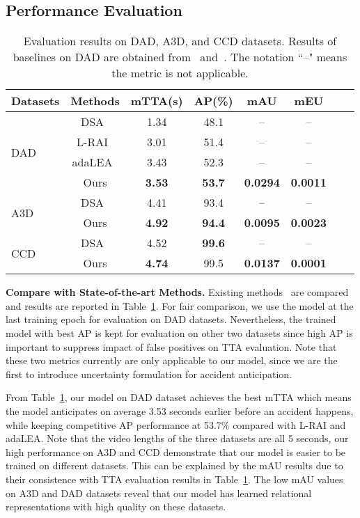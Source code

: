\documentclass[sigconf]{acmart}
\begin{document}
\subsection{Performance Evaluation}

\begin{table}
\setlength{\tabcolsep}{1.5mm}
\centering
\caption{Evaluation results on DAD, A3D, and CCD datasets. Results of baselines on DAD are obtained from~\cite{ZengCVPR2017} and~\cite{SuzukiCVPR2018}. The notation ``--" means the metric is not applicable.}
\label{table:main}
\normalsize
\begin{tabular}{l|c|cccccc}
    \hline
    Datasets &Methods &mTTA(s) &AP(\%) &mAU &mEU \\
    \hline
    \multirow{4}{*}{DAD~\cite{ChanACCV2016}}
    &DSA~\cite{ChanACCV2016} & 1.34 & 48.1 & -- & -- \\  &L-RAI~\cite{ZengCVPR2017} & 3.01 & 51.4 & -- & -- \\
    &adaLEA~\cite{SuzukiCVPR2018} & 3.43 & 52.3 & -- & -- \\
    &Ours & \textbf{3.53} & \textbf{53.7} & \textbf{0.0294} & \textbf{0.0011} \\
    \hline
    \multirow{2}{*}{A3D~\cite{YaoIROS2019}}
    &DSA~\cite{ChanACCV2016} & 4.41 & 93.4 & -- & --\\
    &Ours & \textbf{4.92} & \textbf{94.4} & \textbf{0.0095} & \textbf{0.0023} \\
    \hline
    \multirow{2}{*}{CCD} &DSA~\cite{ChanACCV2016} & 4.52 & \textbf{99.6} & -- & -- \\
    &Ours & \textbf{4.74} & 99.5 & \textbf{0.0137} & \textbf{0.0001} \\
    \hline
\end{tabular}
\end{table}

\textbf{Compare with State-of-the-art Methods.} Existing methods~\cite{ChanACCV2016,ZengCVPR2017,SuzukiCVPR2018} are compared and results are reported in Table~\ref{table:main}. For fair comparison, we use the model at the last training epoch for evaluation on DAD datasets. Nevertheless, the trained model with best AP is kept for evaluation on other two datasets since high AP is important to suppress impact of false positives on TTA evaluation. Note that these two metrics currently are only applicable to our model, since we are the first to introduce uncertainty formulation for accident anticipation.

From Table~\ref{table:main}, our model on DAD dataset achieves the best mTTA which means the model anticipates on average 3.53 seconds earlier before an accident happens, while keeping competitive AP performance at 53.7\% compared with L-RAI and adaLEA. Note that the video lengths of the three datasets are all 5 seconds, our high performance on A3D and CCD demonstrate that our model is easier to be trained on different datasets. This can be explained by the mAU results due to their consistence with TTA evaluation results in Table~\ref{table:main}. The low mAU values on A3D and DAD datasets reveal that our model has learned relational representations with high quality on these datasets.
\end{document}
